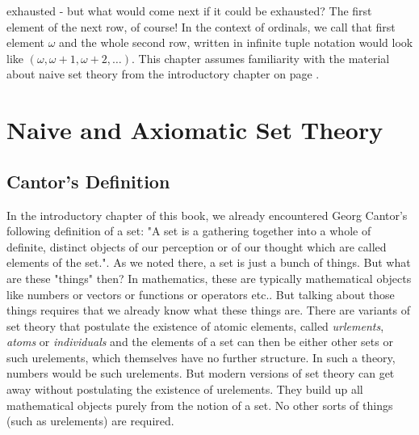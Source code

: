 exhausted - but what would come next if it could be exhausted? The first element of the next row, of course! In the context of ordinals, we call that first element $\omega$ and the whole second row, written in infinite tuple notation would look like $(\omega, \omega+1, \omega+2, \ldots)$. This chapter assumes familiarity with the material about naive set theory from the introductory chapter on page \pageref{Sec:NaiveSetTheory}.




% 

\section{Naive and Axiomatic Set Theory}


\subsection{Cantor's Definition}
In the introductory chapter of this book, we already encountered Georg Cantor's following definition of a set: "A set is a gathering together into a whole of definite, distinct objects of our perception or of our thought which are called elements of the set.". As we noted there, a set is just a bunch of things. But what are these "things" then? In mathematics, these are typically mathematical objects like numbers or vectors or functions or operators etc.. But talking about those things requires that we already know what these things are. There are variants of set theory that postulate the existence of atomic elements, called \emph{urlements}, \emph{atoms} or \emph{individuals} and the elements of a set can then be either other sets or such urelements, which themselves have no further structure. In such a theory, numbers would be such urelements. But modern versions of set theory can get away without postulating the existence of urelements. They build up all mathematical objects purely from the notion of a set. No other sorts of things (such as urelements) are required. 

